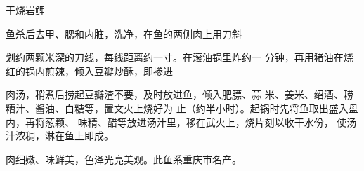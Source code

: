 \begin{recipe}{干烧岩鲤}

\ingredients





\cooking

鱼杀后去甲、腮和内脏，洗净，在鱼的两侧肉上用刀斜

划约两颗米深的刀线，每线距离约一寸。在滚油锅里炸约一 分钟，再用猪油在烧红的锅内煎辣，倾入豆瓣炒酥，即掺进

肉汤，稍煮后捞起豆瓣渣不要，及时放进鱼，倾入肥膘、蒜 米、姜米、绍酒、耢糟汁、酱油、白糖等，置文火上烧好为 止（约半小时）。起锅时先将鱼取出盛入盘内，再将葱颗、 味精、醋等放进汤汁里，移在武火上，烧片刻以收干水份， 使汤汁浓稠，淋在鱼上即成。

\notes

肉细嫩、味鲜美，色泽光亮美观。此鱼系重庆市名产。

\end{recipe}

